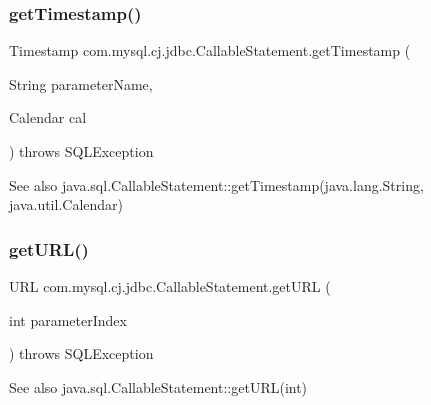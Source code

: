 \subsubsection{\texorpdfstring{get\+Timestamp()}{getTimestamp()}\hspace{0.1cm}{\footnotesize\ttfamily [4/4]}}
{\footnotesize\ttfamily Timestamp com.\+mysql.\+cj.\+jdbc.\+Callable\+Statement.\+get\+Timestamp (\begin{DoxyParamCaption}\item[{String}]{parameter\+Name,  }\item[{Calendar}]{cal }\end{DoxyParamCaption}) throws S\+Q\+L\+Exception}

\begin{DoxySeeAlso}{See also}
java.\+sql.\+Callable\+Statement\+::get\+Timestamp(java.\+lang.\+String, java.\+util.\+Calendar) 
\end{DoxySeeAlso}
\mbox{\label{classcom_1_1mysql_1_1cj_1_1jdbc_1_1_callable_statement_a64d354f54f05a378cc69bff200a58093}} 
\subsubsection{\texorpdfstring{get\+U\+R\+L()}{getURL()}\hspace{0.1cm}{\footnotesize\ttfamily [1/2]}}
{\footnotesize\ttfamily U\+RL com.\+mysql.\+cj.\+jdbc.\+Callable\+Statement.\+get\+U\+RL (\begin{DoxyParamCaption}\item[{int}]{parameter\+Index }\end{DoxyParamCaption}) throws S\+Q\+L\+Exception}

\begin{DoxySeeAlso}{See also}
java.\+sql.\+Callable\+Statement\+::get\+U\+R\+L(int) 
\end{DoxySeeAlso}
\mbox{\label{classcom_1_1mysql_1_1cj_1_1jdbc_1_1_callable_statement_a08e77360a042f37ef9afdd164461e343}} 
